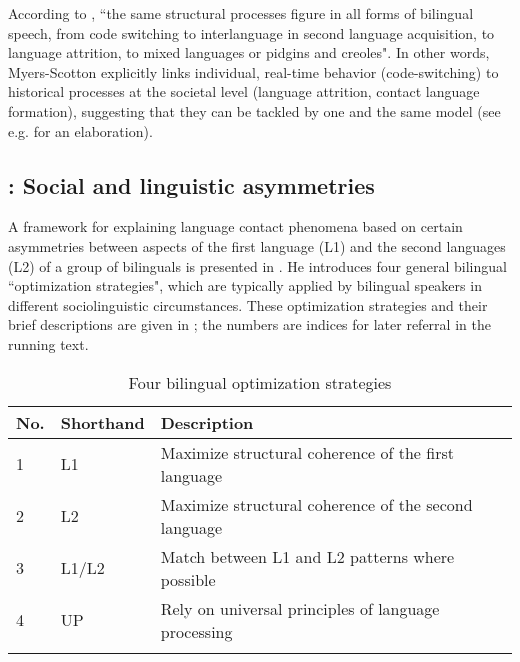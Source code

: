 \documentclass[output=paper]{langscibook}
\begin{document}
According to \textcite[291]{myers1998way}, ``the same structural processes figure in all forms of bilingual speech, from code switching to interlanguage in second language acquisition, to language attrition, to mixed languages or pidgins and creoles". In other words, Myers-Scotton explicitly links individual, real-time behavior (code-switching) to historical processes at the societal level (language attrition, contact language formation), suggesting that they can be tackled by one and the same model (see e.g. \cite{myers1998way} for an elaboration).\\


\subsection{\citet{muysken2013language}: Social and linguistic asymmetries}

A framework for explaining language contact phenomena based on certain asymmetries between aspects of the first language (L1) and the second languages (L2) of a group of bilinguals is presented in \textcite{muysken2013language}. He introduces four general bilingual ``optimization strategies", which are typically applied by bilingual speakers in different sociolinguistic circumstances. These optimization strategies and their brief descriptions are given in ; the numbers are indices for later referral in the running text.

\begin{table}
\caption{Four bilingual optimization strategies}  
\label{tab-muysken_OS}
 \begin{tabular}{lll} 
  \lsptoprule
 No. & Shorthand & Description \\ 
  \midrule
  1 & L1 & Maximize structural coherence of the first language \\
  2 & L2 & Maximize structural coherence of the second language\\
  3 & L1/L2 & Match between L1 and L2 patterns where possible\\
  4 & UP & Rely on universal principles of language processing\\
   \lspbottomrule
 \end{tabular}
\end{table}
\end{document}
